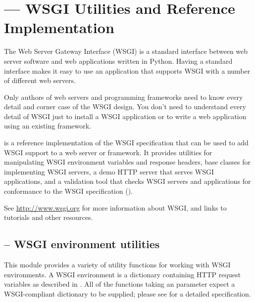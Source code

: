 \section{ --- WSGI Utilities and Reference
Implementation}


The Web Server Gateway Interface (WSGI) is a standard interface
between web server software and web applications written in Python.
Having a standard interface makes it easy to use an application
that supports WSGI with a number of different web servers.

Only authors of web servers and programming frameworks need to know
every detail and corner case of the WSGI design.  You don't need to
understand every detail of WSGI just to install a WSGI application or
to write a web application using an existing framework.

 is a reference implementation of the WSGI specification
that can be used to add WSGI support to a web server or framework.  It
provides utilities for manipulating WSGI environment variables and
response headers, base classes for implementing WSGI servers, a demo
HTTP server that serves WSGI applications, and a validation tool that
checks WSGI servers and applications for conformance to the
WSGI specification ().


See \url{http://www.wsgi.org} for more information about WSGI,
and links to tutorials and other resources.













\subsection{ -- WSGI environment utilities}

This module provides a variety of utility functions for working with
WSGI environments.  A WSGI environment is a dictionary containing
HTTP request variables as described in .  All of the functions
taking an  parameter expect a WSGI-compliant dictionary to
be supplied; please see  for a detailed specification.

